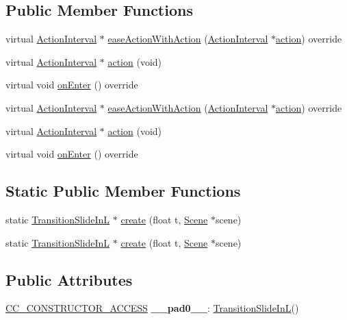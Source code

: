 \subsection*{Public Member Functions}
\begin{DoxyCompactItemize}
\item 
virtual \hyperlink{classActionInterval}{Action\+Interval} $\ast$ \hyperlink{classTransitionSlideInL_a33aad529498bca2822e6e6f12e78ad4c}{ease\+Action\+With\+Action} (\hyperlink{classActionInterval}{Action\+Interval} $\ast$\hyperlink{classTransitionSlideInL_a22b0c0b07f15fc0d19fcdf01e4182a3e}{action}) override
\item 
virtual \hyperlink{classActionInterval}{Action\+Interval} $\ast$ \hyperlink{classTransitionSlideInL_a22b0c0b07f15fc0d19fcdf01e4182a3e}{action} (void)
\item 
virtual void \hyperlink{classTransitionSlideInL_a6dcdddd697019eb9907e6df4a205da98}{on\+Enter} () override
\item 
virtual \hyperlink{classActionInterval}{Action\+Interval} $\ast$ \hyperlink{classTransitionSlideInL_a2f3669a542e5cfe1c56a86626f222039}{ease\+Action\+With\+Action} (\hyperlink{classActionInterval}{Action\+Interval} $\ast$\hyperlink{classTransitionSlideInL_a22b0c0b07f15fc0d19fcdf01e4182a3e}{action}) override
\item 
virtual \hyperlink{classActionInterval}{Action\+Interval} $\ast$ \hyperlink{classTransitionSlideInL_a8941f67b56e12f0f1462aac0c9e5727a}{action} (void)
\item 
virtual void \hyperlink{classTransitionSlideInL_a73601109845268099d90b12808de6b40}{on\+Enter} () override
\end{DoxyCompactItemize}
\subsection*{Static Public Member Functions}
\begin{DoxyCompactItemize}
\item 
static \hyperlink{classTransitionSlideInL}{Transition\+Slide\+InL} $\ast$ \hyperlink{classTransitionSlideInL_acb0d25510a72c361f690a1a9bcbe4bdc}{create} (float t, \hyperlink{classScene}{Scene} $\ast$scene)
\item 
static \hyperlink{classTransitionSlideInL}{Transition\+Slide\+InL} $\ast$ \hyperlink{classTransitionSlideInL_a3ff4ec4b1cebe7fd16d6b13d559d016a}{create} (float t, \hyperlink{classScene}{Scene} $\ast$scene)
\end{DoxyCompactItemize}
\subsection*{Public Attributes}
\begin{DoxyCompactItemize}
\item 
\mbox{\label{classTransitionSlideInL_a29247a5f5d67585c1b7bd5de835efa6a}} 
\hyperlink{_2cocos2d_2cocos_2base_2ccConfig_8h_a25ef1314f97c35a2ed3d029b0ead6da0}{C\+C\+\_\+\+C\+O\+N\+S\+T\+R\+U\+C\+T\+O\+R\+\_\+\+A\+C\+C\+E\+SS} {\bfseries \+\_\+\+\_\+pad0\+\_\+\+\_\+}\+: \hyperlink{classTransitionSlideInL}{Transition\+Slide\+InL}()
\end{DoxyCompactItemize}

